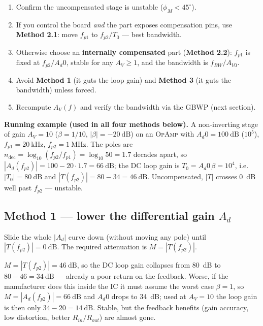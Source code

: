 \documentclass[11pt,a4paper,oneside]{book}
\newcommand{\Ad}{A_d}
\newcommand{\op}{\textsc{OpAmp}}
\begin{document}
\begin{protocol}[Compensate the \op{}]
\begin{enumerate}[leftmargin=1.5cm]
  \item Confirm the uncompensated stage is unstable ($\phi_M<45^\circ$).
  \item If you control the board \emph{and} the part exposes compensation pins,
        use \textbf{Method 2.1}: move $f_{p1}$ to $f_{p2}/T_0$ --- best bandwidth.
  \item Otherwise choose an \textbf{internally compensated} part (\textbf{Method
        2.2}): $f_{p1}$ is fixed at $f_{p2}/\Ad0$, stable for any $A_V\ge1$, and
        the bandwidth is $f_{BW}/A_{V0}$.
  \item Avoid \textbf{Method 1} (it guts the loop gain) and \textbf{Method 3} (it
        guts the bandwidth) unless forced.
  \item Recompute $A_V(f)$ and verify the bandwidth via the GBWP (next section).
\end{enumerate}
\end{protocol}

\begin{note}
\textbf{Running example (used in all four methods below).} A non-inverting stage
of gain $A_V=10$ ($\beta=1/10$, $|\beta|=\qty{-20}{\dB}$) on an \op{} with
$\Ad0=\qty{100}{\dB}$ ($10^5$), $f_{p1}=\qty{20}{\kilo\hertz}$,
$f_{p2}=\qty{1}{\mega\hertz}$. The poles are
$n_{\mathrm{dec}}=\log_{10}(f_{p2}/f_{p1})=\log_{10}50=1.7$ decades apart, so
$|\Ad(f_{p2})|=100-20\cdot1.7=\qty{66}{\dB}$; the DC loop gain is
$T_0=\Ad0\,\beta=10^{4}$, i.e.\ $|T_0|=\qty{80}{\dB}$ and
$|T(f_{p2})|=80-34=\qty{46}{\dB}$. Uncompensated, $|T|$ crosses \qty{0}{\dB} well
past $f_{p2}$ --- unstable.
\end{note}

\subsection{Method 1 --- lower the differential gain $\Ad$}
Slide the whole $|\Ad|$ curve down (without moving any pole) until
$|T(f_{p2})|=\qty{0}{\dB}$. The required attenuation is $M=|T(f_{p2})|$.

\begin{wexample}
$M=|T(f_{p2})|=\qty{46}{\dB}$, so the DC loop gain collapses from \qty{80}{\dB} to
$80-46=\qty{34}{\dB}$ --- already a poor return on the feedback. Worse, if the
manufacturer does this inside the IC it must assume the worst case $\beta=1$, so
$M=|\Ad(f_{p2})|=\qty{66}{\dB}$ and $\Ad0$ drops to \qty{34}{\dB}; used at
$A_V=10$ the loop gain is then only $34-20=\qty{14}{\dB}$. Stable, but the
feedback benefits (gain accuracy, low distortion, better $R_{in}/R_{out}$) are
almost gone.
\end{wexample}
\end{document}

